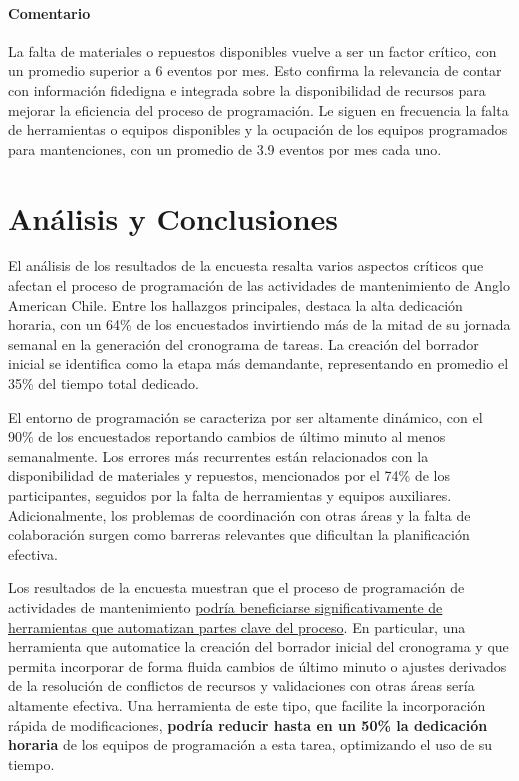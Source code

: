 \documentclass{article}
\begin{document}
\paragraph{Comentario}La falta de materiales o repuestos disponibles vuelve a ser un factor crítico, con un promedio superior a 6 eventos por mes. Esto confirma la relevancia de contar con información fidedigna e integrada sobre la disponibilidad de recursos para mejorar la eficiencia del proceso de programación. Le siguen en frecuencia la falta de herramientas o equipos disponibles y la ocupación de los equipos programados para mantenciones, con un promedio de 3.9 eventos por mes cada uno.

\section*{Análisis y Conclusiones}

El análisis de los resultados de la encuesta resalta varios aspectos críticos que afectan el proceso de programación de las actividades de mantenimiento de Anglo American Chile. Entre los hallazgos principales, destaca la alta dedicación horaria, con un 64\% de los encuestados invirtiendo más de la mitad de su jornada semanal en la generación del cronograma de tareas. La creación del borrador inicial se identifica como la etapa más demandante, representando en promedio el 35\% del tiempo total dedicado.

El entorno de programación se caracteriza por ser altamente dinámico, con el 90\% de los encuestados reportando cambios de último minuto al menos semanalmente. Los errores más recurrentes están relacionados con la disponibilidad de materiales y repuestos, mencionados por el 74\% de los participantes, seguidos por la falta de herramientas y equipos auxiliares. Adicionalmente, los problemas de coordinación con otras áreas y la falta de colaboración surgen como barreras relevantes que dificultan la planificación efectiva.

Los resultados de la encuesta muestran que el proceso de programación de actividades de mantenimiento \uline{podría beneficiarse significativamente de herramientas que automatizan partes clave del proceso}. En particular, una herramienta que automatice la creación del borrador inicial del cronograma y que permita incorporar de forma fluida cambios de último minuto o ajustes derivados de la resolución de conflictos de recursos y validaciones con otras áreas sería altamente efectiva. Una herramienta de este tipo, que facilite la incorporación rápida de modificaciones, \textbf{podría reducir hasta en un 50\% la dedicación horaria} de los equipos de programación a esta tarea, optimizando el uso de su tiempo.
\end{document}
